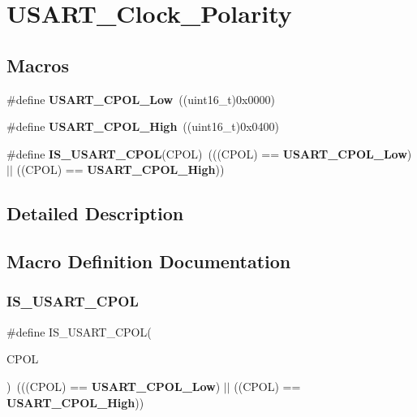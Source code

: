 \section{U\+S\+A\+R\+T\+\_\+\+Clock\+\_\+\+Polarity}
\label{group__USART__Clock__Polarity}
\subsection*{Macros}
\begin{DoxyCompactItemize}
\item 
\#define \textbf{ U\+S\+A\+R\+T\+\_\+\+C\+P\+O\+L\+\_\+\+Low}~((uint16\+\_\+t)0x0000)
\item 
\#define \textbf{ U\+S\+A\+R\+T\+\_\+\+C\+P\+O\+L\+\_\+\+High}~((uint16\+\_\+t)0x0400)
\item 
\#define \textbf{ I\+S\+\_\+\+U\+S\+A\+R\+T\+\_\+\+C\+P\+OL}(C\+P\+OL)~(((C\+P\+OL) == \textbf{ U\+S\+A\+R\+T\+\_\+\+C\+P\+O\+L\+\_\+\+Low}) $\vert$$\vert$ ((C\+P\+OL) == \textbf{ U\+S\+A\+R\+T\+\_\+\+C\+P\+O\+L\+\_\+\+High}))
\end{DoxyCompactItemize}


\subsection{Detailed Description}


\subsection{Macro Definition Documentation}
\mbox{\label{group__USART__Clock__Polarity_ga833e9d2e85ab84658c7a7c18bd0bc8b9}} 
\subsubsection{I\+S\+\_\+\+U\+S\+A\+R\+T\+\_\+\+C\+P\+OL}
{\footnotesize\ttfamily \#define I\+S\+\_\+\+U\+S\+A\+R\+T\+\_\+\+C\+P\+OL(\begin{DoxyParamCaption}\item[{}]{C\+P\+OL }\end{DoxyParamCaption})~(((C\+P\+OL) == \textbf{ U\+S\+A\+R\+T\+\_\+\+C\+P\+O\+L\+\_\+\+Low}) $\vert$$\vert$ ((C\+P\+OL) == \textbf{ U\+S\+A\+R\+T\+\_\+\+C\+P\+O\+L\+\_\+\+High}))}



